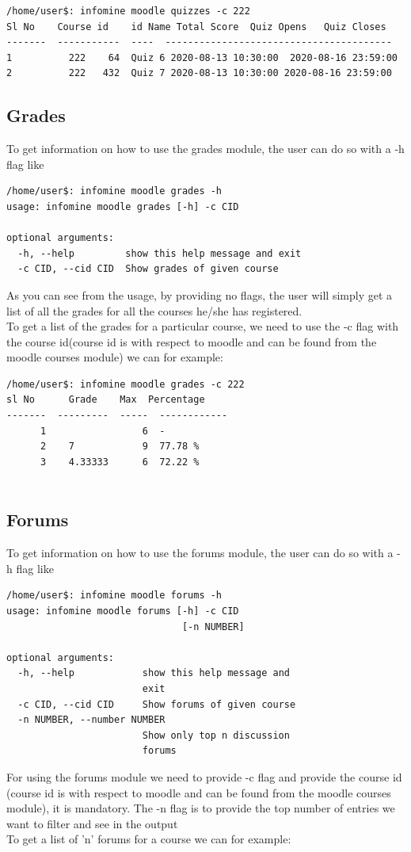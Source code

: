 \documentclass[12pt, a4paper]{article}
\begin{document}
\begin{verbatim}
/home/user$: infomine moodle quizzes -c 222
Sl No    Course id    id Name Total Score  Quiz Opens   Quiz Closes
-------  -----------  ----  ----------------------------------------
1          222    64  Quiz 6 2020-08-13 10:30:00  2020-08-16 23:59:00
2          222   432  Quiz 7 2020-08-13 10:30:00 2020-08-16 23:59:00
\end{verbatim}

\subsection{Grades}
To get information on how to use the grades module, the user can do so with a -h flag like 
\begin{verbatim}
/home/user$: infomine moodle grades -h
usage: infomine moodle grades [-h] -c CID

optional arguments:
  -h, --help         show this help message and exit
  -c CID, --cid CID  Show grades of given course
\end{verbatim}
As you can see from the usage, by providing no flags, the user will simply get a list of all the grades for all the courses he/she has registered.\\
To get a list of the grades for a particular course, we need to use the -c flag with the course id(course id is with respect to moodle and can be found from the moodle courses module) we can for example:

\begin{verbatim}
/home/user$: infomine moodle grades -c 222
sl No      Grade    Max  Percentage
-------  ---------  -----  ------------
      1                 6  -
      2    7            9  77.78 %
      3    4.33333      6  72.22 %
    
\end{verbatim}

\subsection{Forums}
To get information on how to use the forums module, the user can do so with a -h flag like 
\begin{verbatim}
/home/user$: infomine moodle forums -h
usage: infomine moodle forums [-h] -c CID
                               [-n NUMBER]

optional arguments:
  -h, --help            show this help message and
                        exit
  -c CID, --cid CID     Show forums of given course
  -n NUMBER, --number NUMBER
                        Show only top n discussion
                        forums
\end{verbatim}
For using the forums module we need to provide -c flag and provide the course id (course id is with respect to moodle and can be found from the moodle courses module), it is mandatory. The -n flag is to provide the top number of entries we want to filter and see in the output\\
To get a list of 'n' forums for a course we can for example:
\end{document}

